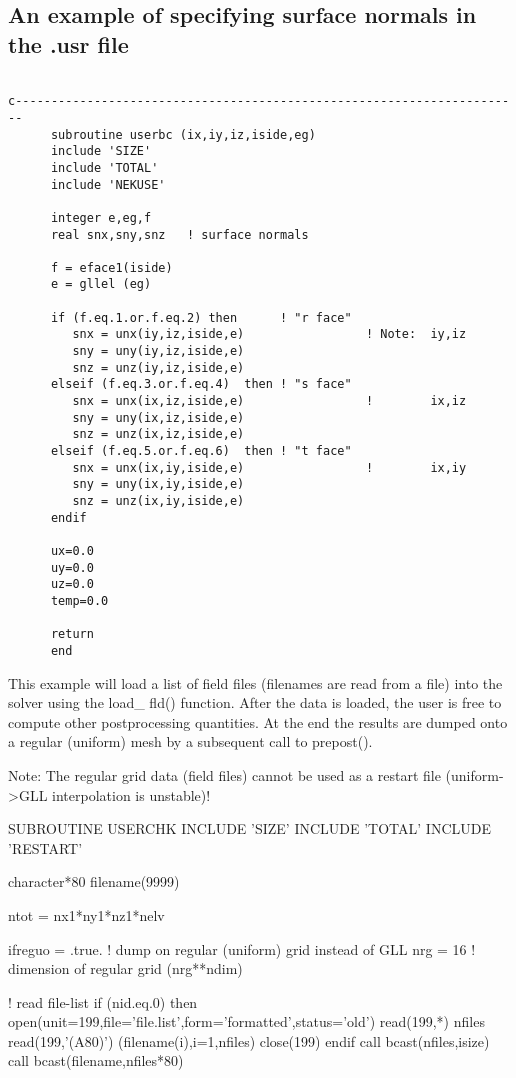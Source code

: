 \subsection*{An example of specifying surface normals in the .usr file}
\begin{verbatim}

c-----------------------------------------------------------------------
      subroutine userbc (ix,iy,iz,iside,eg)
      include 'SIZE'
      include 'TOTAL'
      include 'NEKUSE'

      integer e,eg,f
      real snx,sny,snz   ! surface normals

      f = eface1(iside)
      e = gllel (eg)

      if (f.eq.1.or.f.eq.2) then      ! "r face"
         snx = unx(iy,iz,iside,e)                 ! Note:  iy,iz
         sny = uny(iy,iz,iside,e)
         snz = unz(iy,iz,iside,e)
      elseif (f.eq.3.or.f.eq.4)  then ! "s face"
         snx = unx(ix,iz,iside,e)                 !        ix,iz
         sny = uny(ix,iz,iside,e)
         snz = unz(ix,iz,iside,e)
      elseif (f.eq.5.or.f.eq.6)  then ! "t face"
         snx = unx(ix,iy,iside,e)                 !        ix,iy
         sny = uny(ix,iy,iside,e)
         snz = unz(ix,iy,iside,e)
      endif

      ux=0.0
      uy=0.0
      uz=0.0
      temp=0.0

      return
      end
\end{verbatim}  
This example will load a list of field files (filenames are read from a file) into the solver using the load\_ fld() function. After the data is loaded, the user is free to compute other postprocessing quantities. At the end the results are dumped onto a regular (uniform) mesh by a subsequent call to prepost().

Note: The regular grid data (field files) cannot be used as a restart file (uniform->GLL interpolation is unstable)!


     SUBROUTINE USERCHK
     INCLUDE 'SIZE'
     INCLUDE 'TOTAL'
     INCLUDE 'RESTART' 

     character*80 filename(9999)

     ntot   = nx1*ny1*nz1*nelv

     ifreguo = .true.   ! dump on regular (uniform) grid instead of GLL
     nrg     = 16       ! dimension of regular grid (nrg**ndim)
 
     ! read file-list
     if (nid.eq.0) then
        open(unit=199,file='file.list',form='formatted',status='old')
        read(199,*) nfiles
        read(199,'(A80)') (filename(i),i=1,nfiles)
        close(199)
     endif
     call bcast(nfiles,isize)
     call bcast(filename,nfiles*80)       

